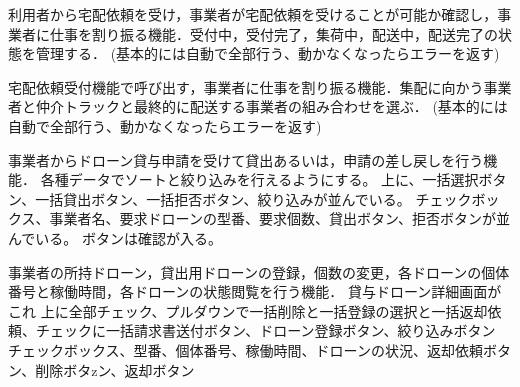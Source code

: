 \documentclass[a4paper, titlepage]{jsarticle}
\begin{document}
\begin{description}[labelwidth=\linewidth]
  \item [宅配依頼受付機能]利用者から宅配依頼を受け，事業者が宅配依頼を受けることが可能か確認し，事業者に仕事を割り振る機能．受付中，受付完了，集荷中，配送中，配送完了の状態を管理する．
  (基本的には自動で全部行う、動かなくなったらエラーを返す)

  \item [宅配仕事割り振り機能]宅配依頼受付機能で呼び出す，事業者に仕事を割り振る機能．集配に向かう事業者と仲介トラックと最終的に配送する事業者の組み合わせを選ぶ．
  (基本的には自動で全部行う、動かなくなったらエラーを返す)

  \item [ドローン貸与機能]事業者からドローン貸与申請を受けて貸出あるいは，申請の差し戻しを行う機能．
  各種データでソートと絞り込みを行えるようにする。
  上に、一括選択ボタン、一括貸出ボタン、一括拒否ボタン、絞り込みが並んでいる。
  チェックボックス、事業者名、要求ドローンの型番、要求個数、貸出ボタン、拒否ボタンが並んでいる。
  ボタンは確認が入る。
  \item [事業者ドローン情報管理機能]事業者の所持ドローン，貸出用ドローンの登録，個数の変更，各ドローンの個体番号と稼働時間，各ドローンの状態閲覧を行う機能．
  貸与ドローン詳細画面がこれ
  上に全部チェック、プルダウンで一括削除と一括登録の選択と一括返却依頼、チェックに一括請求書送付ボタン、ドローン登録ボタン、絞り込みボタン
  チェックボックス、型番、個体番号、稼働時間、ドローンの状況、返却依頼ボタン、削除ボタzン、返却ボタン
\end{description}
\end{document}
